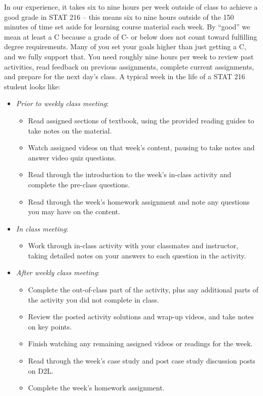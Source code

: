 \documentclass[
]{report}
\providecommand{\tightlist}{%
  \setlength{\itemsep}{0pt}\setlength{\parskip}{0pt}}
\begin{document}
In our experience, it takes six to nine hours per week outside of class to achieve a good grade in STAT 216 -- this means six to nine hours outside of the 150 minutes of time set aside for learning course material each week. By ``good'' we mean at least a C because a grade of C- or below does not count toward fulfilling degree requirements. Many of you set your goals higher than just getting a C, and we fully support that. You
need roughly nine hours per week to review past activities, read feedback on previous assignments, complete current assignments, and prepare for the next day's class. A typical week in the life of a STAT 216 student looks like:

\begin{itemize}
\tightlist
\item
  \emph{Prior to weekly class meeting}:

  \begin{itemize}
  \tightlist
  \item
    Read assigned sections of textbook, using the provided reading guides to take notes on the material.
  \item
    Watch assigned videos on that week's content, pausing to take notes and answer video quiz questions.
  \item
    Read through the introduction to the week's in-class activity and complete the pre-class questions.
  \item
    Read through the week's homework assignment and note any questions you may have on the content.
  \end{itemize}
\item
  \emph{In class meeting}:

  \begin{itemize}
  \tightlist
  \item
    Work through in-class activity with your classmates and instructor, taking detailed notes on your answers to each question in the activity.
  \end{itemize}
\item
  \emph{After weekly class meeting}:

  \begin{itemize}
  \tightlist
  \item
    Complete the out-of-class part of the activity, plus any additional parts of the activity you did not complete in class.
  \item
    Review the posted activity solutions and wrap-up videos, and take notes on key points.
  \item
    Finish watching any remaining assigned videos or readings for the week.
  \item
    Read through the week's case study and post case study discussion posts on D2L.
  \item
    Complete the week's homework assignment.
  \end{itemize}
\end{itemize}
\end{document}
